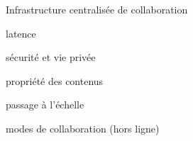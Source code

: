 \begin{frame}{Infrastructure centralisée de collaboration}
\begin{minipage}{\textwidth}
\begin{minipage}{.38\textwidth}
\begin{compactitemize}
                \item latence
                \item sécurité et vie privée
            \end{compactitemize}
        \end{minipage}
        \begin{minipage}{.58\textwidth}
            \begin{compactitemize}
                \item propriété des contenus
                \item passage à l'échelle
                \item modes de collaboration (hors ligne)
            \end{compactitemize}
        \end{minipage}
    \end{minipage}
\end{frame}

